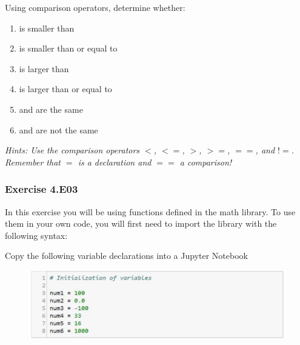 Using comparison operators, determine whether:
\begin{enumerate}[label=(\alph*)]
	\item {} is smaller than {}
	\item {} is smaller than or equal to {}
	\item {} is larger than {}
	\item {} is larger than or equal to {}
	\item {} and {} are the same
	\item {} and {} are not the same
\end{enumerate}

\textit{Hints:
Use the comparison operators $<$, $<=$, $>$, $>=$, $==$, and $!=$. Remember that $=$ is a declaration and $==$ a comparison!}\\[1cm]



\subsubsection*{Exercise 4.E03}
In this exercise you will be using functions defined in the math library. To use them in your
own code, you will first need to import the library with the following syntax:
\begin{center}
	{}
\end{center}
Copy the following variable declarations into a Jupyter Notebook
\begin{figure}[H]
		\centering
		\includegraphics[width=\textwidth]{../IMG/4E03.png} 
\end{figure}

